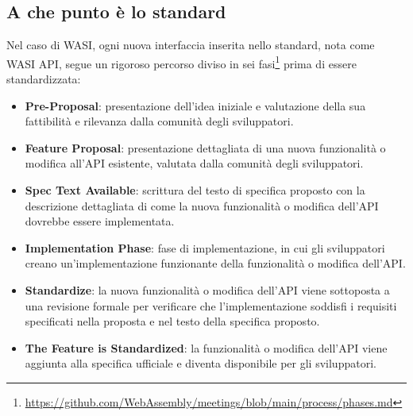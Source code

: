 \subsection{A che punto è lo standard}
Nel caso di WASI, ogni nuova interfaccia inserita nello standard, nota come WASI API, segue un rigoroso percorso diviso
in sei fasi\footnote{\url{https://github.com/WebAssembly/meetings/blob/main/process/phases.md}} prima di essere
standardizzata:
\begin{itemize}
    \item \textbf{Pre-Proposal}: presentazione dell'idea iniziale e valutazione della sua fattibilità e rilevanza dalla
    comunità degli sviluppatori.
    \item \textbf{Feature Proposal}: presentazione dettagliata di una nuova funzionalità o modifica all'API esistente,
    valutata dalla comunità degli sviluppatori.
    \item \textbf{Spec Text Available}: scrittura del testo di specifica proposto con la descrizione dettagliata di come
    la nuova funzionalità o modifica dell'API dovrebbe essere implementata.
    \item \textbf{Implementation Phase}: fase di implementazione, in cui gli sviluppatori creano un'implementazione
    funzionante della funzionalità o modifica dell'API.
    \item \textbf{Standardize}: la nuova funzionalità o modifica dell'API viene sottoposta a una revisione formale per
    verificare che l'implementazione soddisfi i requisiti specificati nella proposta e nel testo della specifica
    proposto.
    \item \textbf{The Feature is Standardized}: la funzionalità o modifica dell'API viene aggiunta alla specifica
    ufficiale e diventa disponibile per gli sviluppatori.
\end{itemize}

